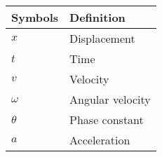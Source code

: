 \documentclass{article}
\begin{document}
\begin{table}[h]
\begin{tabular}{|l|l|}
\hline
\textbf{Symbols} & \textbf{Definition}\\ \hline
$x$ & Displacement \\ \hline
$t$ & Time \\ \hline
$v$ & Velocity\\ \hline
$\omega$ & Angular velocity   \\ \hline
$\theta$ & Phase constant\\ \hline
$a$ & Acceleration\\ \hline
\end{tabular}
\end{table}
\end{document}
